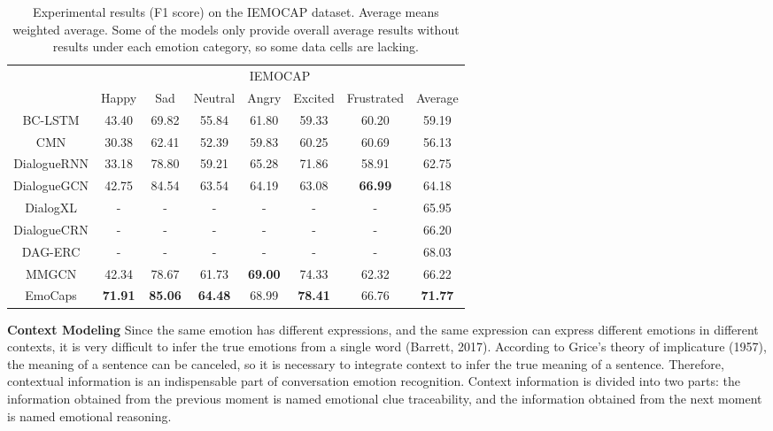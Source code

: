 \begin{table*}[]
	\centering
	\begin{tabular}{c|c|c|c|c|c|c|c}
		\hline
		& \multicolumn{7}{c}{IEMOCAP}                                                                                         \\ \cline{2-8} 
		& Happy          & Sad            & Neutral        & Angry          & Excited        & Frustrated     & Average        \\ \hline
		BC-LSTM        & 43.40          & 69.82          & 55.84          & 61.80          & 59.33          & 60.20          & 59.19          \\
		CMN            & 30.38          & 62.41          & 52.39          & 59.83          & 60.25          & 60.69          & 56.13          \\
		DialogueRNN    & 33.18          & 78.80          & 59.21          & 65.28          & 71.86          & 58.91          & 62.75          \\
		DialogueGCN    & 42.75          & 84.54          & 63.54          & 64.19          & 63.08          & \textbf{66.99} & 64.18          \\
		DialogXL       & -              & -              & -              & -              & -              & -              & 65.95          \\
		DialogueCRN       & -              & -              & -              & -              & -              & -              & 66.20          \\
		DAG-ERC       & -              & -              & -              & -              & -              & -              & 68.03          \\
		MMGCN          & 42.34          & 78.67          & 61.73          & \textbf{69.00} & 74.33          & 62.32          & 66.22          \\ \hline
		EmoCaps & \textbf{71.91} & \textbf{85.06} & \textbf{64.48} & 68.99          & \textbf{78.41} & 66.76          & \textbf{71.77} \\ \hline
	\end{tabular}
	\caption{Experimental results (F1 score) on the IEMOCAP dataset. Average means weighted average. Some of the models only provide overall average results without results under each emotion category, so some data cells are lacking. }
\end{table*}
\noindent\textbf{Context Modeling} Since the same emotion has different expressions, and the same expression can express different emotions in different contexts, it is very difficult to infer the true emotions from a single word (Barrett, 2017). According to Grice's theory of implicature (1957), the meaning of a sentence can be canceled, so it is necessary to integrate context to infer the true meaning of a sentence. Therefore, contextual information is an indispensable part of conversation emotion recognition. Context information is divided into two parts: the information obtained from the previous moment is named emotional clue traceability, and the information obtained from the next moment is named emotional reasoning.

